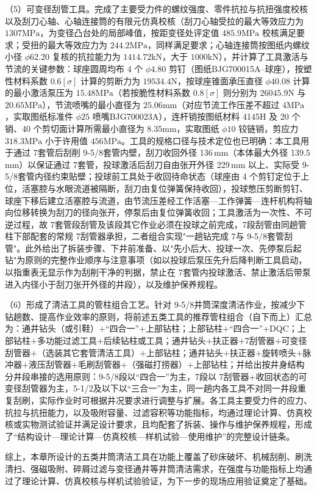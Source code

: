 （5）可变径刮管工具。完成了主要受力件的螺纹强度、零件抗拉与抗扭强度校核以及刮刀心轴、心轴连接筒的有限元仿真校核（刮刀心轴受拉的最大等效应力为 $1307\mathrm{MPa}$，为变径凸台处的局部峰值，按距变径处评定值 $485.9\mathrm{MPa}$ 校核满足要求；受扭的最大等效应力为 $244.2\mathrm{MPa}$，同样满足要求；心轴连接筒按图纸内螺纹小径 $\phi 62.20$ 复核的抗拉能力为 $1414.72\mathrm{kN}$，大于 $1000\mathrm{kN}$），并计算了工具激活与节流的关键参数：球座圆周均布 4 个 $\phi 4.80$ 剪钉（图纸BJG700015A--球座），按塑性材料系数 $0.6[\sigma]$ 计算的剪断力为 $19534.4\mathrm{N}$，按球座锥面承压直径 $\phi 40.08$ 计算的最小激活泵压为 $15.48\mathrm{MPa}$（若按脆性材料系数 $0.8[\sigma]$ 则分别为 $26045.9\mathrm{N}$ 与 $20.65\mathrm{MPa}$），节流喷嘴的最小直径为 $25.06\mathrm{mm}$（对应节流工作压差不超过 $4\mathrm{MPa}$，实取图纸标准件 $\phi 25$ 喷嘴BJG700023A），连杆销按图纸材料 4145H 及 20 个销、40 个剪切面计算所需最小直径为 $8.35\mathrm{mm}$，实取图纸 $\phi 10$ 铰链销，剪应力 $318.3\mathrm{MPa}$ 小于许用值 $456\mathrm{MPa}$。工具的规格口径与技术定位也已明确：本工具用于通过 7\inch 套管后刮削 9-5/8\inch 套管内壁，刮刀收回外径 136\,mm（本体最大外径 139.5\,mm）以保证通过 7\inch 套管，投球激活后刮刀自由张开外径 229\,mm 以上、实际受 9-5/8\inch 套管内径约束贴壁；投球前工具处于收回待命状态（球座由 4 个剪钉定位于上位，活塞腔与水眼流道被隔断，刮刀由复位弹簧保持收回），投球憋压剪断剪钉、球座下移后建立活塞腔与流道，由节流压差经工作活塞—工作弹簧—连杆机构将轴向位移转换为刮刀的径向张开，停泵后由复位弹簧收回；工具激活为一次性、不可逆过程，故 7\inch 套管段刮管及该段其它作业必须在投球之前完成，7\inch 段刮管由同趟管柱下部配套的常规 7\inch 刮管器承担，二者组合实现"一趟钻完成 7\inch 与 9-5/8\inch 套管刮管"。此外给出了拆装步骤、下井前准备、以"先小后大、投球一次、先停泵后起钻"为原则的完整作业顺序与注意事项（如以投球后泵压先升后降判断工具启动，以指重表无显示作为刮削干净的判据，禁止在 7\inch 套管内投球激活、禁止激活后带泵进入内径小于刮刀张开外径的井段），以及维护保养规程。

（6）形成了清洁工具的管柱组合工艺。针对 9-5/8\inch 井筒深度清洁作业，按减少下钻趟数、提高作业效率的原则，将前述五类工具的推荐管柱组合（自下而上）汇总为：通井钻头（或引鞋）$+$“四合一”$+$上部钻柱；上部钻柱$+$“四合一”$+$DQC；上部钻柱$+$多功能过滤工具$+$后续钻柱或工具；通井钻头$+$扶正器$+$7\inch 刮管器$+$可变径刮管器$+$（选装其它套管清洁工具）$+$上部钻柱；通井钻头$+$扶正器$+$旋转喷头$+$脉冲器$+$液压刮管器$+$毛刷刮管器$+$（强磁打捞器）$+$上部钻柱；并给出按井身结构分井段串接的选用原则：9-5/8\inch 段以“四合一”为主，7\inch 段以 7\inch 刮管器$+$收回状态的可变径刮管器为主，5-1/2\inch 及以下以“三合一”为主，同一趟内各工具不对同一井段重复刮刷，实际作业时可根据井况要求进行调整与扩展。各工具主要受力件的应力、抗拉与抗扭能力，以及吸附容量、过滤容积等功能指标，均通过理论计算、仿真校核或实物测试验证并满足设计要求，且均配套了拆装、操作与维护保养规程，形成了“结构设计—理论计算—仿真校核—样机试验—使用维护”的完整设计链条。

综上，本章所设计的五类井筒清洁工具在功能上覆盖了砂床破坏、机械刮削、刷洗清扫、强磁吸附、碎屑过滤与变径通井等井筒清洁需求，在强度与功能指标上均通过了理论计算、仿真校核与样机试验验证，为下一步的现场应用验证奠定了基础。

